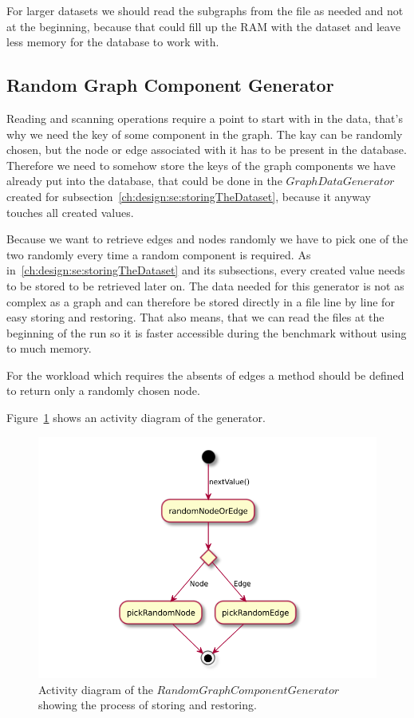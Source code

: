 For larger datasets we should read the subgraphs from the file as needed and not at the beginning,
because that could fill up the RAM with the dataset and leave less memory for the database to work with.

\subsection{Random Graph Component Generator}
Reading and scanning operations require a point to start with in the data,
that's why we need the key of some component in the graph.
The kay can be randomly chosen,
but the node or edge associated with it has to be present in the database.
Therefore we need to somehow store the keys of the graph components we have already put into the database,
that could be done in the $ GraphDataGenerator $ created for subsection~\ref{ch:design:se:storingTheDataset},
because it anyway touches all created values.

Because we want to retrieve edges and nodes randomly we have to pick one of the two randomly every time a random component is required.
As in~\ref{ch:design:se:storingTheDataset} and its subsections,
every created value needs to be stored to be retrieved later on.
The data needed for this generator is not as complex as a graph and can therefore be stored directly in a file line by line for easy storing and restoring.
That also means,
that we can read the files at the beginning of the run so it is faster accessible during the benchmark without using to much memory.

For the workload which requires the absents of edges a method should be defined to return only a randomly chosen node.

Figure~\ref{fig:randomGraphComponentGenerator} shows an activity diagram of the generator.

\begin{figure}
  \includegraphics{images/randomGraphComponentGenerator}
  \caption{Activity diagram of the $ RandomGraphComponentGenerator $ showing the process of storing and restoring.\todo{}}
  \label{fig:randomGraphComponentGenerator}
\end{figure}

